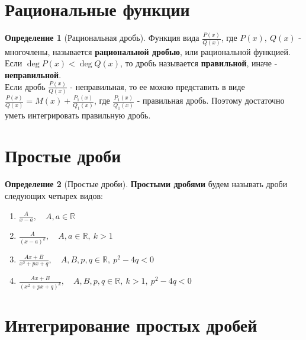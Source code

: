 \documentclass{report}
\theoremstyle{definition}
\newtheorem*{definition}{Определение}
\begin{document}
\section{Рациональные функции}

\begin{definition}[Рациональная дробь]
    Функция вида \(\frac{P(x)}{Q(x)}\), где \(P(x), \ Q(x)\) - многочлены, называется \textbf{рациональной дробью},
    или рациональной функцией. \\
    Если \(\deg P(x) < \deg Q(x)\), то дробь называется \textbf{правильной}, иначе - \textbf{неправильной}. \\
    Если дробь \(\frac{P(x)}{Q(x)}\) - неправильная, то ее можно представить в виде \(\frac{P(x)}{Q(x)} = M(x) +
    \frac{P_{1}(x)}{Q_{1}(x)}\), где \(\frac{P_{1}(x)}{Q_{1}(x)}\) - правильная дробь. Поэтому достаточно уметь
    интегрировать правильную дробь.
\end{definition}

\section{Простые дроби}

\begin{definition}[Простые дроби]
    \textbf{Простыми дробями} будем называть дроби следующих четырех видов:
    \begin{enumerate}
        \item \(\frac{A}{x - a}, \quad A,a \in \mathbb{R}\)
        \item \(\frac{A}{(x - a)^{k}}, \quad A,a \in \mathbb{R}, \ k > 1\)
        \item \(\frac{Ax + B}{x^{2} + px + q}, \quad A,B,p,q \in \mathbb{R}, \ p^{2} - 4q < 0\)
        \item \(\frac{Ax + B}{(x^{2} + px + q)^{k}}, \quad A,B,p,q \in \mathbb{R}, \ k > 1, \ p^{2} - 4q < 0\)
    \end{enumerate}
\end{definition}

\clearpage

\section{Интегрирование простых дробей}
\end{document}
